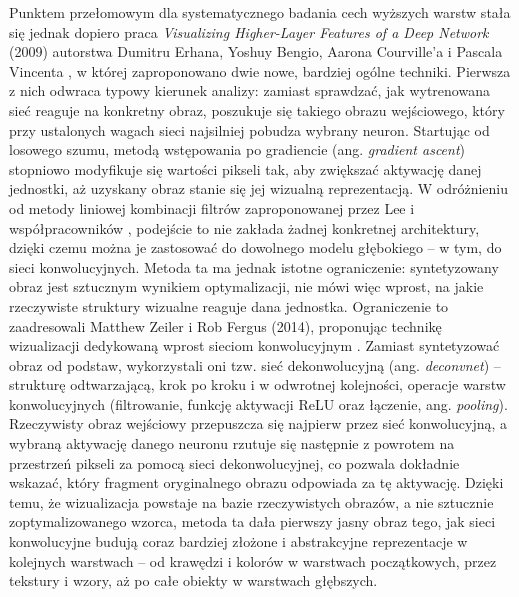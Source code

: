 Punktem przełomowym dla systematycznego badania cech wyższych warstw stała się jednak dopiero praca \textit{Visualizing Higher-Layer Features of a Deep Network} (2009) autorstwa Dumitru Erhana, Yoshuy Bengio, Aarona Courville'a i Pascala Vincenta \cite{erhan_visualizing_higher_layer_features}, w której zaproponowano dwie nowe, bardziej ogólne techniki. Pierwsza z nich odwraca typowy kierunek analizy: zamiast sprawdzać, jak wytrenowana sieć reaguje na konkretny obraz, poszukuje się takiego obrazu wejściowego, który przy ustalonych wagach sieci najsilniej pobudza wybrany neuron. Startując od losowego szumu, metodą wstępowania po gradiencie (ang. \textit{gradient ascent}) stopniowo modyfikuje się wartości pikseli tak, aby zwiększać aktywację danej jednostki, aż uzyskany obraz stanie się jej wizualną reprezentacją. W odróżnieniu od metody liniowej kombinacji filtrów zaproponowanej przez Lee i współpracowników \cite{lee_sparse_deep_belief_net_model_for_visual_area_v2}, podejście to nie zakłada żadnej konkretnej architektury, dzięki czemu można je zastosować do dowolnego modelu głębokiego -- w tym, do sieci konwolucyjnych. Metoda ta ma jednak istotne ograniczenie: syntetyzowany obraz jest sztucznym wynikiem optymalizacji, nie mówi więc wprost, na jakie rzeczywiste struktury wizualne reaguje dana jednostka. \newline
Ograniczenie to zaadresowali Matthew Zeiler i Rob Fergus (2014), proponując technikę wizualizacji dedykowaną wprost sieciom konwolucyjnym \cite{zeiler_visualizing_and_understanding}. Zamiast syntetyzować obraz od podstaw, wykorzystali oni tzw. sieć dekonwolucyjną (ang. \textit{deconvnet}) -- strukturę odtwarzającą, krok po kroku i w odwrotnej kolejności, operacje warstw konwolucyjnych (filtrowanie, funkcję aktywacji ReLU oraz łączenie, ang. \textit{pooling}). Rzeczywisty obraz wejściowy przepuszcza się najpierw przez sieć konwolucyjną, a wybraną aktywację danego neuronu rzutuje się następnie z powrotem na przestrzeń pikseli za pomocą sieci dekonwolucyjnej, co pozwala dokładnie wskazać, który fragment oryginalnego obrazu odpowiada za tę aktywację. Dzięki temu, że wizualizacja powstaje na bazie rzeczywistych obrazów, a nie sztucznie zoptymalizowanego wzorca, metoda ta dała pierwszy jasny obraz tego, jak sieci konwolucyjne budują coraz bardziej złożone i abstrakcyjne reprezentacje w kolejnych warstwach -- od krawędzi i kolorów w warstwach początkowych, przez tekstury i wzory, aż po całe obiekty w warstwach głębszych. \newline
